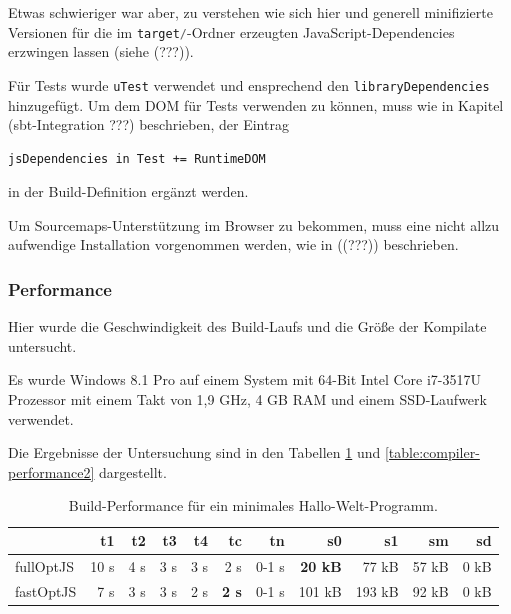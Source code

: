 \documentclass[a4paper, 12pt, hidelinks, listof=totoc, listoftables=totoc, bibliography=totoc]{scrreprt}
\newcommand{\code}[1]{\lstinline[language=Scala, style=inline]|#1|}
\begin{document}
Etwas schwieriger war aber, zu verstehen wie sich hier und generell minifizierte Versionen für die im \code{target/}-Ordner erzeugten JavaScript-Dependencies erzwingen lassen (siehe (???)).

Für Tests wurde \code{uTest} verwendet und ensprechend den \code{libraryDependencies} hinzugefügt. Um dem DOM für Tests verwenden zu können, muss wie in Kapitel (sbt-Integration ???) beschrieben, der Eintrag
\begin{lstlisting}[style=snippet]
jsDependencies in Test += RuntimeDOM
\end{lstlisting}
in der Build-Definition ergänzt werden.

Um Sourcemaps-Unterstützung im Browser zu bekommen, muss eine nicht allzu aufwendige Installation vorgenommen werden, wie in ((???)) beschrieben.

\subsubsection{Performance}

Hier wurde die Geschwindigkeit des Build-Laufs und die Größe der Kompilate untersucht.

Es wurde Windows 8.1 Pro auf einem System mit 64-Bit Intel Core i7-3517U Prozessor mit einem Takt von 1,9 GHz, 4 GB RAM und einem SSD-Laufwerk verwendet.

Die Ergebnisse der Untersuchung sind in den Tabellen \ref{table:compiler-performance1} und \ref{table:compiler-performance2} dargestellt.

\medskip

\begin{table}[!h]
\begin{tabular}{|l|r|r|r|r|r|r||r|r|r|r|}
\hline           & t1   & t2   & t3   & t4   & tc            & tn    & s0             & s1     & sm    & sd    \\ 
\hline fullOptJS & 10 s &  4 s &  3 s &  3 s &          2 s  & 0-1 s & \textbf{20 kB} &  77 kB & 57 kB &  0 kB \\ 
\hline fastOptJS &  7 s &  3 s &  3 s &  2 s &  \textbf{2 s} & 0-1 s &        101 kB  & 193 kB & 92 kB &  0 kB \\ 
\hline 
\end{tabular} 
\caption{Build-Performance für ein minimales Hallo-Welt-Programm.}
\label{table:compiler-performance1}
\end{table}

\medskip
\end{document}
